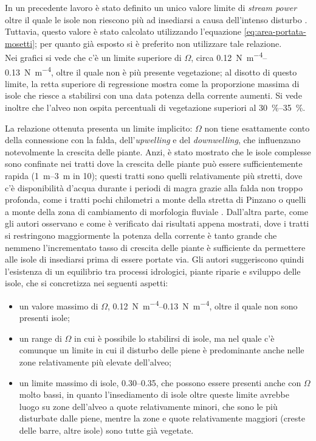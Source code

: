 In un precedente lavoro è stato definito un unico valore limite di \emph{stream power} oltre il quale le isole non riescono più ad insediarsi a causa dell'intenso disturbo .
Tuttavia, questo valore è stato calcolato utilizzando l'equazione \eqref{eq:area-portata-mosetti}; per quanto già esposto si è preferito non utilizzare tale relazione.
\\
Nei grafici si vede che c'è un limite superiore di $\Omega$, circa \SIrange[range-phrase={-}]{0.12}{0.13}{\newton\per\metre\tothe{4}}, oltre il quale non è più presente vegetazione; al disotto di questo limite, la retta superiore di regressione mostra come la proporzione massima di isole che riesce a stabilirsi con una data potenza della corrente aumenti.
Si vede inoltre che l'alveo non ospita percentuali di vegetazione superiori al \SIrange[range-phrase={-}]{30}{35}{\percent}.

La relazione ottenuta presenta un limite implicito: $\Omega$ non tiene esattamente conto della connessione con la falda, dell'\emph{upwelling} e del \emph{downwelling}, che influenzano notevolmente la crescita delle piante.
Anzi, è stato mostrato che le isole complesse sono confinate nei tratti dove la crescita delle piante può essere sufficientemente rapida (\SIrange[range-phrase={-}]{1}{3}{\m} in \SI{10}{\anni}); questi tratti sono quelli relativamente più stretti, dove c'è disponibilità d'acqua durante i periodi di magra grazie alla falda non troppo profonda, come i tratti pochi chilometri a monte della stretta di Pinzano o quelli a monte della zona di cambiamento di morfologia fluviale .
Dall'altra parte, come gli autori osservano e come è verificato dai risultati appena mostrati, dove i tratti si restringono maggiormente la potenza della corrente è tanto grande che nemmeno l'incrementato tasso di crescita delle piante è sufficiente da permettere alle isole di insediarsi prima di essere portate via.
Gli autori suggeriscono quindi l'esistenza di un equilibrio tra processi idrologici, piante riparie e sviluppo delle isole, che si concretizza nei seguenti aspetti:
%
\begin{itemize}
	\item un valore massimo di $\Omega$, \SIrange[range-phrase={-}]{0.12}{0.13}{\newton\per\metre\tothe{4}}, oltre il quale non sono presenti isole;
	\item un range di $\Omega$ in cui è possibile lo stabilirsi di isole, ma nel quale c'è comunque un limite in cui il disturbo delle piene è predominante anche nelle zone relativamente più elevate dell'alveo;
	\item un limite massimo di isole, \numrange[range-phrase={-}]{0.30}{0.35}, che possono essere presenti anche con $\Omega$ molto bassi, in quanto l'insediamento di isole oltre queste limite avrebbe luogo su zone dell'alveo a quote relativamente minori, che sono le più disturbate dalle piene, mentre la zone e quote relativamente maggiori (creste delle barre, altre isole) sono tutte già vegetate.
\end{itemize}